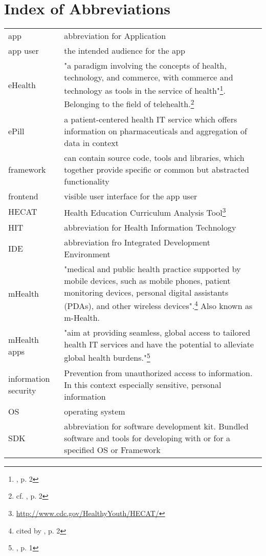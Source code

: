 \section*{Index of Abbreviations}
\begin{longtable}{@{}p{}@{}p{}@{}}
    app & abbreviation for Application\\
    app user & the intended audience for the app\\
    eHealth & "a paradigm involving the concepts of health, technology, and commerce, with commerce and technology as tools in the service of health"\footnote{\cite{MartinezPerez.2013}, p. 2}. Belonging to the field of telehealth.\footnote{cf. \cite{MartinezPerez.2013}, p. 2}\\
    ePill & a patient-centered health IT service which offers information on pharmaceuticals and aggregation of data in context\\
    framework & can contain source code, tools and libraries, which together provide specific or common but abstracted functionality\\
    frontend & visible user interface for the app user\\
    HECAT & Health Education Curriculum Analysis Tool\footnote{\url{http://www.cdc.gov/HealthyYouth/HECAT/}}\\
    HIT & abbreviation for Health Information Technology\\
    IDE & abbreviation fro Integrated Development Environment\\
    mHealth & "medical and public health practice supported by mobile devices, such as mobile phones, patient monitoring devices, personal digital assistants (PDAs), and other wireless devices".\footnote{\cite{WorldHealthOrganization.2011} cited by \cite{MartinezPerez.2013}, p. 2} Also known as m-Health.\\
    mHealth apps & "aim at providing seamless, global access to tailored health IT services and have the potential to alleviate global health burdens."\footnote{\cite{Dehling.2013}, p. 1}\\
    information security & Prevention from unauthorized access to information. In this context especially sensitive, personal information\\
    OS & operating system\\
    SDK & abbreviation for software development kit. Bundled software and tools for developing with or for a specified OS or Framework\\

\end{longtable}
